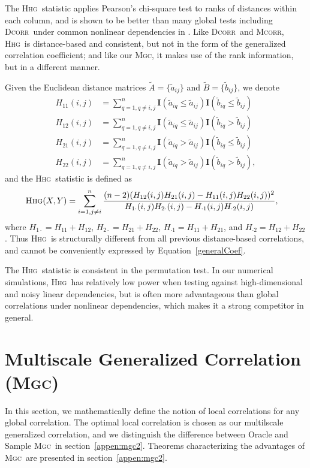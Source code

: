 \documentclass[11pt]{article}
\providecommand{\sct}[1]{{\normalfont\textsc{#1}}}
\providecommand{\mb}[1]{\boldsymbol{#1}}
\newcommand{\Mgc}{\sct{Mgc}}
\newcommand{\Hhg}{\sct{Hhg}}
\newcommand{\Dcorr}{\sct{Dcorr}}
\newcommand{\Mcorr}{\sct{Mcorr}}
\begin{document}
The \Hhg~statistic applies Pearson's chi-square test to ranks of distances within each column, and is shown to be better than many global tests including \Dcorr~under common nonlinear dependencies in \cite{GorfineHellerHeller2012, HellerGorfine2013}. Like \Dcorr~and \Mcorr, \Hhg~is distance-based and consistent, but not in the form of the generalized correlation coefficient; and like our \Mgc, it makes use of the rank information, but in a different manner.

Given the Euclidean distance matrices $\tilde{A}=\{\tilde{a}_{ij}\}$ and $\tilde{B}=\{\tilde{b}_{ij}\}$, we denote
\begin{align*}
H_{11}(i,j) &= \sum_{q=1,q\neq i,j}^{n}\mb{I}(\tilde{a}_{iq} \leq \tilde{a}_{ij})\mb{I}(\tilde{b}_{iq} \leq \tilde{b}_{ij}) \\
H_{12}(i,j) &= \sum_{q=1,q\neq i,j}^{n}\mb{I}(\tilde{a}_{iq} \leq \tilde{a}_{ij})\mb{I}(\tilde{b}_{iq} > \tilde{b}_{ij}) \\
H_{21}(i,j) &= \sum_{q=1,q\neq i,j}^{n}\mb{I}(\tilde{a}_{iq} > \tilde{a}_{ij})\mb{I}(\tilde{b}_{iq} \leq \tilde{b}_{ij}) \\
H_{22}(i,j) &= \sum_{q=1,q\neq i,j}^{n}\mb{I}(\tilde{a}_{iq} > \tilde{a}_{ij})\mb{I}(\tilde{b}_{iq} > \tilde{b}_{ij}),
\end{align*}
and the \Hhg~statistic is defined as
\begin{align*}
\Hhg(X,Y) &= \sum_{i=1,j\neq i}^{n} \frac{(n-2)(H_{12}(i,j)H_{21}(i,j)-H_{11}(i,j)H_{22}(i,j))^2}{H_{1 \cdot}(i,j)H_{2 \cdot}(i,j)-H_{\cdot 1}(i,j)H_{\cdot 2}(i,j)},
\end{align*}
where $H_{1 \cdot}=H_{11}+H_{12}$, $H_{2 \cdot}=H_{21}+H_{22}$, $H_{\cdot 1}=H_{11}+H_{21}$, and $H_{\cdot 2}=H_{12}+H_{22}$. Thus \Hhg~is structurally different from all previous distance-based correlations, and cannot be conveniently expressed by Equation~\ref{generalCoef}.

The \Hhg~statistic is consistent in the permutation test. In our numerical simulations, \Hhg~has relatively low power when testing against high-dimensional and noisy linear dependencies, but is often more advantageous than global correlations under nonlinear dependencies, which makes it a strong competitor in general. 

\section{Multiscale Generalized Correlation (\Mgc)}
\label{appen:mgc}
In this section, we mathematically define the notion of local correlations for any global correlation. The optimal local correlation is chosen as our multilscale generalized correlation, and we distinguish the difference between Oracle and Sample \Mgc~in section~\ref{appen:mgc2}. Theorems characterizing the advantages of \Mgc~are presented in section~\ref{appen:mgc2}. 
\end{document}
